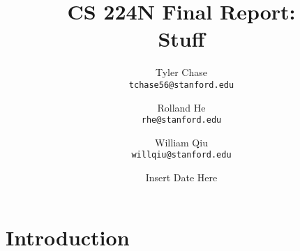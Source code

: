 \documentclass[11pt]{article}
\title{\vspace{-2cm}CS 224N Final Report: \\ Stuff}
\author{Tyler Chase \\ \texttt{tchase56@stanford.edu} \and
  Rolland He \\ \texttt{rhe@stanford.edu} \and
  William Qiu \\ \texttt{willqiu@stanford.edu}}
\date{Insert Date Here}
\begin{document}
\maketitle

\vspace{-1cm}
\section{Introduction}


\end{document}
